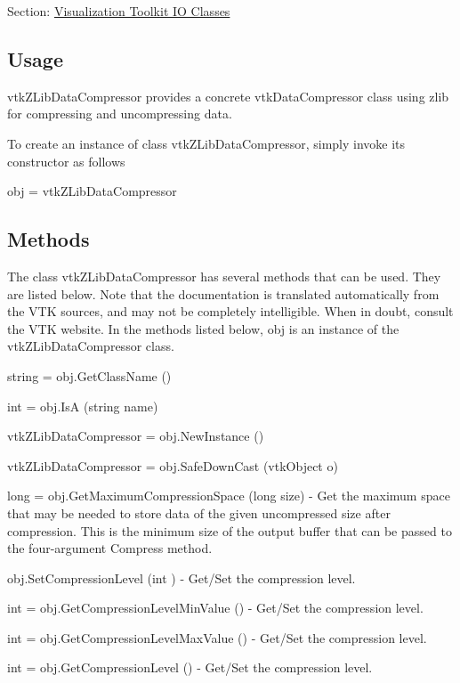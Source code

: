 Section\-: \hyperlink{sec_vtkio}{Visualization Toolkit I\-O Classes} \hypertarget{vtkwidgets_vtkxyplotwidget_Usage}{}\subsection{Usage}\label{vtkwidgets_vtkxyplotwidget_Usage}
vtk\-Z\-Lib\-Data\-Compressor provides a concrete vtk\-Data\-Compressor class using zlib for compressing and uncompressing data.

To create an instance of class vtk\-Z\-Lib\-Data\-Compressor, simply invoke its constructor as follows \begin{DoxyVerb}  obj = vtkZLibDataCompressor
\end{DoxyVerb}
 \hypertarget{vtkwidgets_vtkxyplotwidget_Methods}{}\subsection{Methods}\label{vtkwidgets_vtkxyplotwidget_Methods}
The class vtk\-Z\-Lib\-Data\-Compressor has several methods that can be used. They are listed below. Note that the documentation is translated automatically from the V\-T\-K sources, and may not be completely intelligible. When in doubt, consult the V\-T\-K website. In the methods listed below, {\ttfamily obj} is an instance of the vtk\-Z\-Lib\-Data\-Compressor class. 
\begin{DoxyItemize}
\item {\ttfamily string = obj.\-Get\-Class\-Name ()}  
\item {\ttfamily int = obj.\-Is\-A (string name)}  
\item {\ttfamily vtk\-Z\-Lib\-Data\-Compressor = obj.\-New\-Instance ()}  
\item {\ttfamily vtk\-Z\-Lib\-Data\-Compressor = obj.\-Safe\-Down\-Cast (vtk\-Object o)}  
\item {\ttfamily long = obj.\-Get\-Maximum\-Compression\-Space (long size)} -\/ Get the maximum space that may be needed to store data of the given uncompressed size after compression. This is the minimum size of the output buffer that can be passed to the four-\/argument Compress method.  
\item {\ttfamily obj.\-Set\-Compression\-Level (int )} -\/ Get/\-Set the compression level.  
\item {\ttfamily int = obj.\-Get\-Compression\-Level\-Min\-Value ()} -\/ Get/\-Set the compression level.  
\item {\ttfamily int = obj.\-Get\-Compression\-Level\-Max\-Value ()} -\/ Get/\-Set the compression level.  
\item {\ttfamily int = obj.\-Get\-Compression\-Level ()} -\/ Get/\-Set the compression level.  
\end{DoxyItemize}